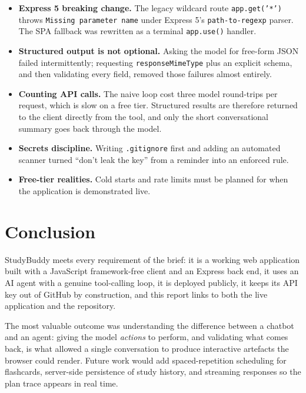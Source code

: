 \documentclass[11pt,a4paper]{article}
\begin{document}
\begin{itemize}[leftmargin=*]
  \item \textbf{Express 5 breaking change.} The legacy wildcard route \texttt{app.get('*')} throws
        \texttt{Missing parameter name} under Express 5's \texttt{path-to-regexp} parser. The SPA
        fallback was rewritten as a terminal \texttt{app.use()} handler.
  \item \textbf{Structured output is not optional.} Asking the model for free-form JSON failed
        intermittently; requesting \texttt{responseMimeType} plus an explicit schema, and then
        validating every field, removed those failures almost entirely.
  \item \textbf{Counting API calls.} The naive loop cost three model round-trips per request,
        which is slow on a free tier. Structured results are therefore returned to the client
        directly from the tool, and only the short conversational summary goes back through the
        model.
  \item \textbf{Secrets discipline.} Writing \texttt{.gitignore} first and adding an automated
        scanner turned ``don't leak the key'' from a reminder into an enforced rule.
  \item \textbf{Free-tier realities.} Cold starts and rate limits must be planned for when the
        application is demonstrated live.
\end{itemize}

\section{Conclusion}

StudyBuddy meets every requirement of the brief: it is a working web application built with a
JavaScript framework-free client and an Express back end, it uses an AI agent with a genuine
tool-calling loop, it is deployed publicly, it keeps its API key out of GitHub by construction,
and this report links to both the live application and the repository.

The most valuable outcome was understanding the difference between a chatbot and an agent:
giving the model \emph{actions} to perform, and validating what comes back, is what allowed a
single conversation to produce interactive artefacts the browser could render. Future work would
add spaced-repetition scheduling for flashcards, server-side persistence of study history, and
streaming responses so the plan trace appears in real time.
\end{document}
